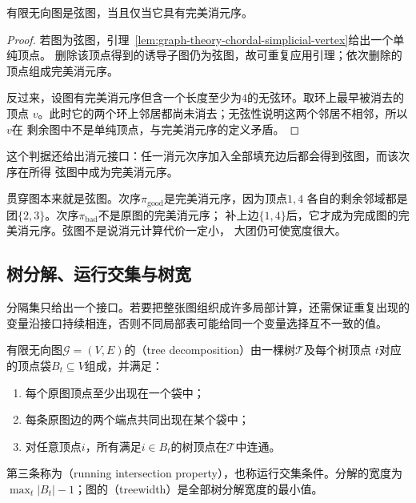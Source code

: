 \begin{theorem}[弦图与完美消元序]
  \label{thm:graph-theory-chordal-perfect-elimination}
  有限无向图是弦图，当且仅当它具有完美消元序。
\end{theorem}

\begin{proof}
若图为弦图，引理~\ref{lem:graph-theory-chordal-simplicial-vertex}给出一个单纯顶点。
删除该顶点得到的诱导子图仍为弦图，故可重复应用引理；依次删除的顶点组成完美消元序。

反过来，设图有完美消元序但含一个长度至少为\(4\)的无弦环。取环上最早被消去的顶点
\(v\)。此时它的两个环上邻居都尚未消去；无弦性说明这两个邻居不相邻，所以\(v\)在
剩余图中不是单纯顶点，与完美消元序的定义矛盾。
\end{proof}

这个判据还给出消元接口：任一消元次序加入全部填充边后都会得到弦图，而该次序在所得
弦图中成为完美消元序。

贯穿图本来就是弦图。次序\(\pi_{\mathrm{good}}\)是完美消元序，因为顶点\(1,4\)
各自的剩余邻域都是团\(\{2,3\}\)。次序\(\pi_{\mathrm{bad}}\)不是原图的完美消元序；
补上边\(\{1,4\}\)后，它才成为完成图的完美消元序。弦图不是说消元计算代价一定小，
大团仍可使宽度很大。

\subsection{树分解、运行交集与树宽}
\label{sec:graph-theory-tree-decomposition}

分隔集只给出一个接口。若要把整张图组织成许多局部计算，还需保证重复出现的变量沿接口持续相连，否则不同局部表可能给同一个变量选择互不一致的值。

\begin{definition}[树分解与树宽]
\label{def:graph-theory-tree-decomposition}
有限无向图$\mathcal G=(V,E)$的（tree decomposition）由一棵树\(\mathcal{T}\)及每个树顶点
\(t\)对应的顶点袋\(B_t\subseteq V\)组成，并满足：
\begin{enumerate}
  \item 每个原图顶点至少出现在一个袋中；
  \item 每条原图边的两个端点共同出现在某个袋中；
  \item 对任意顶点\(i\)，所有满足\(i\in B_t\)的树顶点在\(\mathcal{T}\)中连通。
\end{enumerate}
第三条称为（running intersection property），也称运行交集条件。分解的宽度为$\max_t|B_t|-1$；图的（treewidth）是全部树分解宽度的最小值。
\end{definition}

